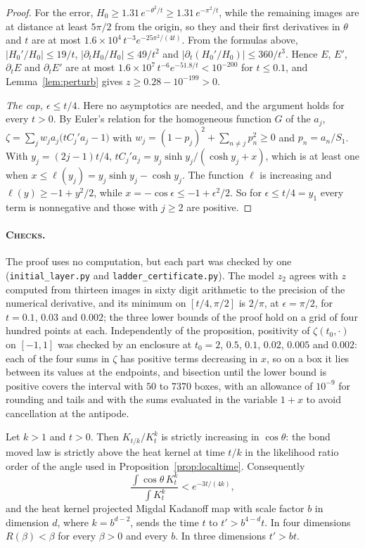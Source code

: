 \begin{proof}
For the error, $H_0\ge1.31\,e^{-\theta^2/t}\ge1.31\,e^{-\pi^2/t}$, while the remaining images are at distance at least $5\pi/2$ from the origin, so they and their first derivatives in $\theta$ and $t$ are at most $1.6\times10^4\,t^{-3}e^{-25\pi^2/(4t)}$. From the formulas above, $|H_0'/H_0|\le19/t$, $|\partial_tH_0/H_0|\le49/t^2$ and $|\partial_t(H_0'/H_0)|\le360/t^3$. Hence $E$, $E'$, $\partial_tE$ and $\partial_tE'$ are at most $1.6\times10^7\,t^{-6}e^{-51.8/t}<10^{-200}$ for $t\le0.1$, and Lemma~\ref{lem:perturb} gives $z\ge0.28-10^{-199}>0$.

\emph{The cap, $\epsilon\le t/4$.} Here no asymptotics are needed, and the argument holds for every $t>0$. By Euler's relation for the homogeneous function $G$ of the $a_j$, $\zeta=\sum_jw_ja_j\big(tC_j'a_j-1\big)$ with $w_j=(1-p_j)^2+\sum_{n\ne j}p_n^2\ge0$ and $p_n=a_n/S_1$. With $y_j=(2j-1)t/4$, $tC_j'a_j=y_j\sinh y_j/(\cosh y_j+x)$, which is at least one when $x\le \ell(y_j)=y_j\sinh y_j-\cosh y_j$. The function $\ell$ is increasing and $\ell(y)\ge-1+y^2/2$, while $x=-\cos\epsilon\le-1+\epsilon^2/2$. So for $\epsilon\le t/4=y_1$ every term is nonnegative and those with $j\ge2$ are positive.
\end{proof}

\paragraph{\normalfont\scshape Checks.} The proof uses no computation, but each part was checked by one (\texttt{initial\_layer.py} and \texttt{ladder\_certificate.py}). The model $z_2$ agrees with $z$ computed from thirteen images in sixty digit arithmetic to the precision of the numerical derivative, and its minimum on $[t/4,\pi/2]$ is $2/\pi$, at $\epsilon=\pi/2$, for $t=0.1$, $0.03$ and $0.002$; the three lower bounds of the proof hold on a grid of four hundred points at each. Independently of the proposition, positivity of $\zeta(t_0,\cdot)$ on $[-1,1]$ was checked by an enclosure at $t_0=2$, $0.5$, $0.1$, $0.02$, $0.005$ and $0.002$: each of the four sums in $\zeta$ has positive terms decreasing in $x$, so on a box it lies between its values at the endpoints, and bisection until the lower bound is positive covers the interval with $50$ to $7370$ boxes, with an allowance of $10^{-9}$ for rounding and tails and with the sums evaluated in the variable $1+x$ to avoid cancellation at the antipode.

\begin{corollary}\label{cor:contracts}
Let $k>1$ and $t>0$. Then $K_{t/k}/K_t^k$ is strictly increasing in $\cos\theta$: the bond moved law is strictly above the heat kernel at time $t/k$ in the likelihood ratio order of the angle used in Proposition~\ref{prop:localtime}. Consequently
\[
\frac{\int\cos\theta\,K_t^k}{\int K_t^k}<e^{-3t/(4k)},
\]
and the heat kernel projected Migdal Kadanoff map with scale factor $b$ in dimension $d$, where $k=b^{d-2}$, sends the time $t$ to $t'>b^{4-d}t$. In four dimensions $R(\beta)<\beta$ for every $\beta>0$ and every $b$. In three dimensions $t'>bt$.
\end{corollary}

